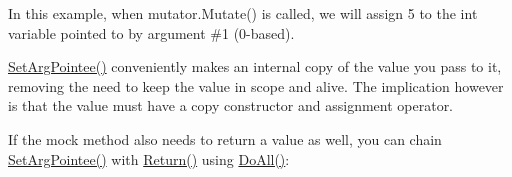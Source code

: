\begin{DoxyCode}{0}
\DoxyCodeLine{}
\DoxyCodeLine{ \textcolor{keyword}{public}:}
\DoxyCodeLine{\};}
\DoxyCodeLine{}
\end{DoxyCode}


In this example, when {\ttfamily mutator.\+Mutate()} is called, we will assign 5 to the {\ttfamily int} variable pointed to by argument \#1 (0-\/based).

{\ttfamily \mbox{\hyperlink{namespacetesting_a6dbe77dc170c495ea300dd9d74ed4595}{Set\+Arg\+Pointee()}}} conveniently makes an internal copy of the value you pass to it, removing the need to keep the value in scope and alive. The implication however is that the value must have a copy constructor and assignment operator.

If the mock method also needs to return a value as well, you can chain {\ttfamily \mbox{\hyperlink{namespacetesting_a6dbe77dc170c495ea300dd9d74ed4595}{Set\+Arg\+Pointee()}}} with {\ttfamily \mbox{\hyperlink{namespacetesting_adae3994eb444d1ad2dd602454b854663}{Return()}}} using {\ttfamily \mbox{\hyperlink{namespacetesting_a3824c79dc6e9e05c337a675e82da2045}{Do\+All()}}}\+:


